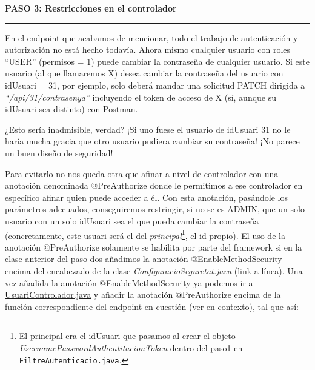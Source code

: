 \documentclass[a4paper,12pt]{report}
\begin{document}
		
		\noindent \textbf{PASO 3: Restricciones en el controlador}
		\hrule
		\vspace{1em}
		
		En el endpoint que acabamos de mencionar, todo el trabajo de autenticación y autorización no está hecho todavía. Ahora mismo cualquier usuario con roles ``USER'' (permisos = 1) puede cambiar la contraseña de cualquier usuario. Si este usuario (al que llamaremos X) desea cambiar la contraseña del usuario con idUsuari = 31, por ejemplo, solo deberá mandar una solicitud PATCH dirigida a \textit{``/api/31/contrasenya''} incluyendo el token de acceso de X (sí, aunque su idUsuari sea distinto) con Postman.
		
		¿Esto sería inadmisible, verdad? ¡Si uno fuese el usuario de idUsuari 31 no le haría mucha gracia que otro usuario pudiera cambiar su contraseña! ¡No parece un buen diseño de seguridad!
		
		Para evitarlo no nos queda otra que afinar a nivel de controlador con una anotación denominada @PreAuthorize donde le permitimos a ese controlador en específico afinar quien puede acceder a él. Con esta anotación, pasándole los parámetros adecuados, conseguiremos restringir, si no se es ADMIN, que un solo usuario con un solo idUsuari sea el que pueda cambiar la contraseña (concretamente, este usuari será el del \textit{principal}\footnote{El principal era el idUsuari que pasamos al crear el objeto \textit{UsernamePasswordAuthentitacionToken} dentro del paso1 en \texttt{FiltreAutenticacio.java}.}, el id propio).  El uso de la anotación @PreAuthorize solamente se habilita por parte del framework si en la clase anterior del paso dos añadimos la anotación @EnableMethodSecurity encima del encabezado de la clase \textit{ConfiguracioSeguretat.java} (\href{https://github.com/blackcub3s/mercApp/blob/db26ff53664be55223c793cf9b52ade87688be45/APP%20WEB/__springboot__produccio__/app/src/main/java/miApp/app/seguretat/ConfiguracioSeguretat.java#L16}{link a línea}). Una vez añadida la anotación @EnableMethodSecurity ya podemos ir a \href{		https://github.com/blackcub3s/mercApp/blob/db26ff53664be55223c793cf9b52ade87688be45/APP%20WEB/__springboot__produccio__/app/src/main/java/miApp/app/Usuaris/controlador/UsuariControlador.java#L263}{UsuariControlador.java} y añadir la anotación @PreAuthorize encima de la función correspondiente del endpoint en cuestión \href{https://github.com/blackcub3s/mercApp/blob/db26ff53664be55223c793cf9b52ade87688be45/APP%20WEB/__springboot__produccio__/app/src/main/java/miApp/app/Usuaris/controlador/UsuariControlador.java#L263}{(ver en contexto)}, tal que así:
		
\end{document}
